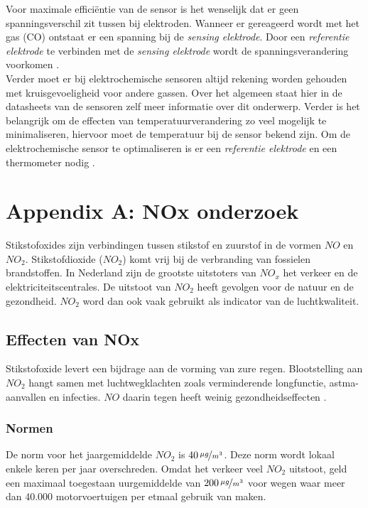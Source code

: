 \documentclass[a4paper, 11pt]{article} %
\begin{document}
	\newpage
	Voor maximale efficiëntie van de sensor is het wenselijk dat er geen spanningsverschil zit tussen bij elektroden. Wanneer er gereageerd wordt met het gas (CO) ontstaat er een spanning bij de \textit{sensing elektrode}. Door een \textit{referentie elektrode} te verbinden met de \textit{sensing elektrode} wordt de spanningsverandering voorkomen \cite{SGX Intro}.\\
	Verder moet er bij elektrochemische sensoren altijd rekening worden gehouden met kruisgevoeligheid voor andere gassen. Over het algemeen staat hier in de datasheets van de sensoren zelf meer informatie over dit onderwerp. Verder is het belangrijk om de effecten van temperatuurverandering zo veel mogelijk te minimaliseren, hiervoor moet de temperatuur bij de sensor bekend zijn. Om de elektrochemische sensor te optimaliseren is er een \textit{referentie elektrode} en een thermometer nodig \cite{SGX Intro}.
	\newpage
	\appendix
	\section{Appendix A: NOx onderzoek}
	Stikstofoxides zijn verbindingen tussen stikstof en zuurstof in de vormen $NO$ en $NO_2$. Stikstofdioxide ($NO_2$) komt vrij bij de verbranding van fossielen brandstoffen. In Nederland zijn de grootste uitstoters van $NO_x$ het verkeer en de elektriciteitscentrales.  De uitstoot van $NO_2$ heeft gevolgen voor de natuur en de gezondheid. $NO_2$ word dan ook vaak gebruikt als indicator van de luchtkwaliteit.
	
	\subsection{Effecten van NOx}
	Stikstofoxide levert een bijdrage aan de vorming van zure regen. Blootstelling aan $NO_2$ hangt samen met luchtwegklachten zoals verminderende longfunctie, astma-aanvallen en infecties. $NO$ daarin tegen heeft weinig gezondheidseffecten \cite{NO2_Amsterdam}. 
	
	
	\subsubsection{Normen}
	De norm voor het jaargemiddelde $NO_2$ is 	$40\,\nicefrac{\mu g}{m^{3}}$. Deze norm wordt lokaal enkele keren per jaar overschreden. Omdat het verkeer veel $NO_2$ uitstoot, geld een maximaal toegestaan uurgemiddelde van $200\,\nicefrac{\mu g}{m^{3}}$ voor wegen waar meer dan 40.000 motorvoertuigen per etmaal gebruik van maken.
	
\end{document}
